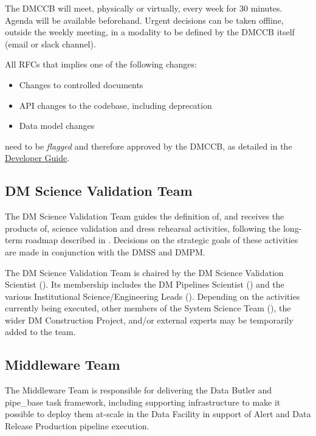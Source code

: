 The DMCCB will meet, physically or virtually, every week for 30 minutes. Agenda will be available beforehand.
Urgent decisions can be taken offline, outside the weekly meeting, in a modality to be defined by the DMCCB itself (email or slack channel).

All RFCs that implies one of the following changes:

\begin{itemize}
\item Changes to controlled documents
\item API changes to the codebase, including deprecation
\item Data model changes
\end{itemize}

need to be \textit{flagged} and therefore approved by the DMCCB, as detailed in the \href{https://developer.lsst.io/communications/rfc.html#rfc-exceptions}{Developer Guide}.


\subsection{DM Science Validation Team}
\label{sect:dmsvt}

The DM Science Validation Team guides the definition of, and receives the products of, science validation and dress rehearsal activities, following the long-term roadmap described in .
Decisions on the strategic goals of these activities are made in conjunction with the \gls{DMSS} and \gls{DMPM}.

The DM Science Validation Team is chaired by the DM Science Validation Scientist ().
Its membership includes the DM Pipelines Scientist () and the various Institutional Science/Engineering Leads ().
Depending on the activities currently being executed, other members of the System Science Team (), the wider DM Construction Project, and/or external experts may be temporarily added to the team.


\subsection{Middleware Team \label{sec:middleware}}

The Middleware Team is responsible for delivering the Data Butler and pipe\_base task framework, including supporting infrastructure to make it possible to deploy them at-scale in the Data Facility in support of Alert and Data Release Production pipeline execution.


